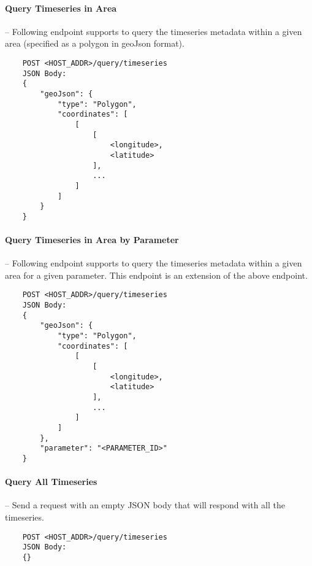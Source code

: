 \paragraph{Query Timeseries in Area} -- Following endpoint supports to query the timeseries metadata within a given area (specified as a polygon in geoJson format).
\begin{lstlisting}
    POST <HOST_ADDR>/query/timeseries
    JSON Body:
    {
        "geoJson": {
            "type": "Polygon",
            "coordinates": [
                [
                    [
                        <longitude>,
                        <latitude>
                    ],
                    ...
                ]
            ]
        }
    }
\end{lstlisting}

\paragraph{Query Timeseries in Area by Parameter}-- Following endpoint supports to query the timeseries metadata within a given area for a given parameter. This endpoint is an extension of the above endpoint.
\begin{lstlisting}
    POST <HOST_ADDR>/query/timeseries
    JSON Body:
    {
        "geoJson": {
            "type": "Polygon",
            "coordinates": [
                [
                    [
                        <longitude>,
                        <latitude>
                    ],
                    ...
                ]
            ]
        },
        "parameter": "<PARAMETER_ID>"
    }
\end{lstlisting}

\paragraph{Query All Timeseries} -- Send a request with an empty JSON body that will respond with all the timeseries.
\begin{lstlisting}
    POST <HOST_ADDR>/query/timeseries
    JSON Body:
    {}
\end{lstlisting}

